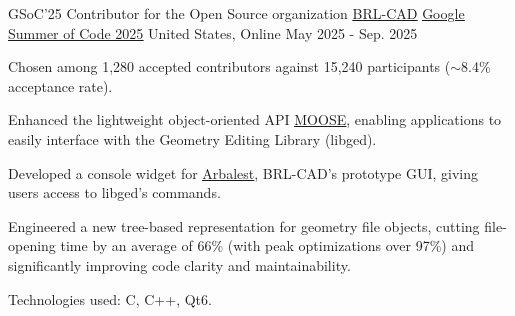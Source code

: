 

\begin{cventries}

  \cventry
    {GSoC'25 Contributor for the Open Source organization \underline{\href{https://github.com/BRL-CAD/brlcad}{BRL-CAD}}} %
    {\underline{\href{https://summerofcode.withgoogle.com/programs/2025/projects/25f08iuM}{Google Summer of Code 2025}}} %
    {United States, Online} %
    {May 2025 - Sep. 2025} %
    {
      \begin{cvitems} %
        \item {Chosen among 1,280 accepted contributors against 15,240 participants ($\sim$8.4\% acceptance rate).}
        \item {Enhanced the lightweight object-oriented API \underline{\href{https://github.com/BRL-CAD/MOOSE}{MOOSE}}, enabling applications to easily interface with the Geometry Editing Library (libged).}
        \item {Developed a console widget for \underline{\href{https://github.com/BRL-CAD/arbalest}{Arbalest}}, BRL-CAD's prototype GUI, giving users access to libged's commands.}
        \item {Engineered a new tree-based representation for geometry file objects, cutting file-opening time by an average of 66\% (with peak optimizations over 97\%) and significantly improving code clarity and maintainability.}
        \item {Technologies used: C, C++, Qt6.}
      \end{cvitems}
    }

\end{cventries}
